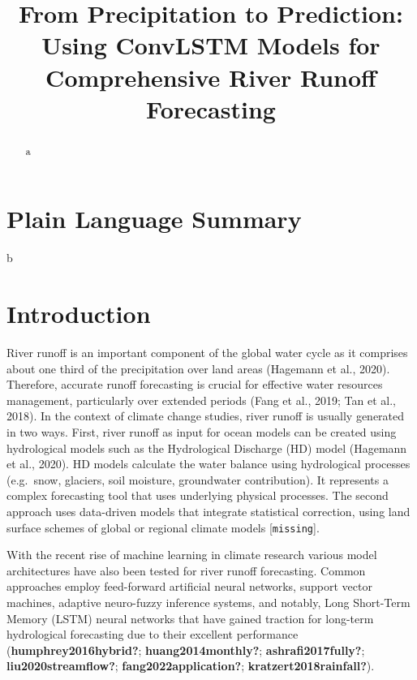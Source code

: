 \documentclass[
]{agujournal2019}
\begin{document}
\title{From Precipitation to Prediction: Using ConvLSTM Models for
Comprehensive River Runoff Forecasting}



\begin{abstract}
a
\end{abstract}

\section*{Plain Language Summary}
b



\section{Introduction}\label{introduction}

River runoff is an important component of the global water cycle as it
comprises about one third of the precipitation over land areas (Hagemann
et al., 2020). Therefore, accurate runoff forecasting is crucial for
effective water resources management, particularly over extended periods
(Fang et al., 2019; Tan et al., 2018). In the context of climate change
studies, river runoff is usually generated in two ways. First, river
runoff as input for ocean models can be created using hydrological
models such as the Hydrological Discharge (HD) model (Hagemann et al.,
2020). HD models calculate the water balance using hydrological
processes (e.g.~snow, glaciers, soil moisture, groundwater
contribution). It represents a complex forecasting tool that uses
underlying physical processes. The second approach uses data-driven
models that integrate statistical correction, using land surface schemes
of global or regional climate models {[}\texttt{missing}{]}.

With the recent rise of machine learning in climate research various
model architectures have also been tested for river runoff forecasting.
Common approaches employ feed-forward artificial neural networks,
support vector machines, adaptive neuro-fuzzy inference systems, and
notably, Long Short-Term Memory (LSTM) neural networks that have gained
traction for long-term hydrological forecasting due to their excellent
performance (\textbf{humphrey2016hybrid?}; \textbf{huang2014monthly?};
\textbf{ashrafi2017fully?}; \textbf{liu2020streamflow?};
\textbf{fang2022application?}; \textbf{kratzert2018rainfall?}).
\end{document}
